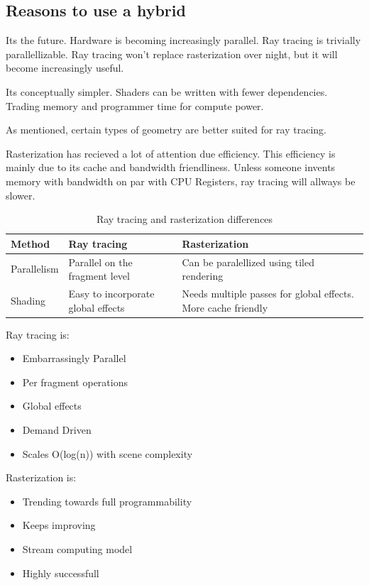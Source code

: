 \subsection{Reasons to use a hybrid}

Its the future. Hardware is becoming increasingly parallel. Ray tracing is trivially parallellizable. Ray tracing won't replace rasterization over night, but it will become increasingly useful.

Its conceptually simpler. Shaders can be written with fewer dependencies. Trading memory and programmer time for compute power.

As mentioned, certain types of geometry are better suited for ray tracing.

Rasterization has recieved a lot of attention due efficiency. This efficiency is mainly due to its cache and bandwidth friendliness. Unless someone invents memory with bandwidth on par with CPU Registers, ray tracing will allways be slower.

\begin{table}[ht]
	\centering
		\begin{tabular*}{0.75\textwidth}{l | l | l |}
		  Method & Ray tracing & Rasterization  \\ \hline
			Parallelism & Parallel on the fragment level & Can be paralellized using tiled rendering \\
			Shading & Easy to incorporate global effects & Needs multiple passes for global effects. More cache friendly \\
		\end{tabular*}
	\caption{Ray tracing and rasterization differences}
	\label{tab:RayTracingAndRasterizationDifferences}
\end{table}


Ray tracing is:

\begin{itemize}
	\item Embarrassingly Parallel
	\item Per fragment operations
	\item Global effects
	\item Demand Driven
	\item Scales O(log(n)) with scene complexity
\end{itemize}

Rasterization is:

\begin{itemize}
	\item Trending towards full programmability
	\item Keeps improving
	\item Stream computing model
	\item Highly successfull
\end{itemize}

